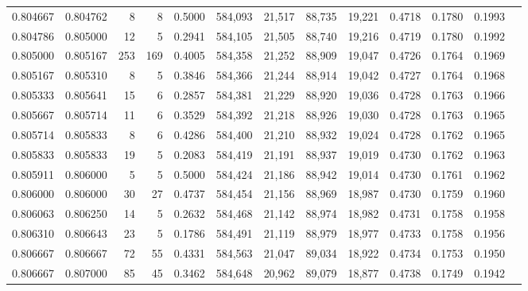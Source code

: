 \begin{tabular}{rrrrrrrrrrrrr}
0.804667 & 0.804762 &     8 &   8 &                                     0.5000 & 584,093 &  21,517 &  88,735 &  19,221 & 0.4718 & 0.1780 & 0.1993 \\
0.804786 & 0.805000 &    12 &   5 &                                     0.2941 & 584,105 &  21,505 &  88,740 &  19,216 & 0.4719 & 0.1780 & 0.1992 \\
0.805000 & 0.805167 &   253 & 169 &                                     0.4005 & 584,358 &  21,252 &  88,909 &  19,047 & 0.4726 & 0.1764 & 0.1969 \\
0.805167 & 0.805310 &     8 &   5 &                                     0.3846 & 584,366 &  21,244 &  88,914 &  19,042 & 0.4727 & 0.1764 & 0.1968 \\
0.805333 & 0.805641 &    15 &   6 &                                     0.2857 & 584,381 &  21,229 &  88,920 &  19,036 & 0.4728 & 0.1763 & 0.1966 \\
0.805667 & 0.805714 &    11 &   6 &                                     0.3529 & 584,392 &  21,218 &  88,926 &  19,030 & 0.4728 & 0.1763 & 0.1965 \\
0.805714 & 0.805833 &     8 &   6 &                                     0.4286 & 584,400 &  21,210 &  88,932 &  19,024 & 0.4728 & 0.1762 & 0.1965 \\
0.805833 & 0.805833 &    19 &   5 &                                     0.2083 & 584,419 &  21,191 &  88,937 &  19,019 & 0.4730 & 0.1762 & 0.1963 \\
0.805911 & 0.806000 &     5 &   5 &                                     0.5000 & 584,424 &  21,186 &  88,942 &  19,014 & 0.4730 & 0.1761 & 0.1962 \\
0.806000 & 0.806000 &    30 &  27 &                                     0.4737 & 584,454 &  21,156 &  88,969 &  18,987 & 0.4730 & 0.1759 & 0.1960 \\
0.806063 & 0.806250 &    14 &   5 &                                     0.2632 & 584,468 &  21,142 &  88,974 &  18,982 & 0.4731 & 0.1758 & 0.1958 \\
0.806310 & 0.806643 &    23 &   5 &                                     0.1786 & 584,491 &  21,119 &  88,979 &  18,977 & 0.4733 & 0.1758 & 0.1956 \\
0.806667 & 0.806667 &    72 &  55 &                                     0.4331 & 584,563 &  21,047 &  89,034 &  18,922 & 0.4734 & 0.1753 & 0.1950 \\
0.806667 & 0.807000 &    85 &  45 &                                     0.3462 & 584,648 &  20,962 &  89,079 &  18,877 & 0.4738 & 0.1749 & 0.1942 \\

\end{tabular}
